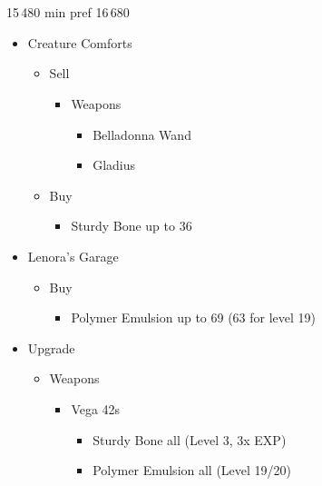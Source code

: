 \chapter[Chapter 6]{}


\begin{shop}{15\,480 min pref 16\,680}
\begin{multicols}{2}
\begin{itemize}
    \item Creature Comforts
    \begin{itemize}
        \item Sell
        \begin{itemize}
            \item Weapons
            \begin{itemize}
                \item Belladonna Wand
                \item Gladius
            \end{itemize}
        \end{itemize}
        \item Buy
        \begin{itemize}
            \item Sturdy Bone up to 36
        \end{itemize}
    \end{itemize}
    \columnbreak
    \item Lenora's Garage
    \begin{itemize}
        \item Buy
        \begin{itemize}
            \item Polymer Emulsion up to 69 (63 for level 19)
        \end{itemize}
    \end{itemize}
\end{itemize}
\end{multicols}
\end{shop}

\begin{upgrade}
\begin{itemize}
    \item Upgrade
    \begin{itemize}
        \item Weapons
        \begin{itemize}
            \item Vega 42s
            \begin{itemize}
                \item Sturdy Bone all (Level 3, 3x EXP)
                \item Polymer Emulsion all (Level 19/20)
            \end{itemize}
        \end{itemize}
    \end{itemize}
\end{itemize}
\end{upgrade}

